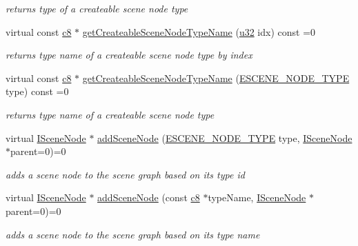 \begin{DoxyCompactItemize}
\begin{DoxyCompactList}\small\item\em returns type of a createable scene node type \end{DoxyCompactList}\item 
virtual const \hyperlink{namespaceirr_a9395eaea339bcb546b319e9c96bf7410}{c8} $\ast$ \hyperlink{classirr_1_1scene_1_1ISceneNodeFactory_a259f156cc367a9a89f79159ad2b665ac}{get\+Createable\+Scene\+Node\+Type\+Name} (\hyperlink{namespaceirr_a0416a53257075833e7002efd0a18e804}{u32} idx) const =0
\begin{DoxyCompactList}\small\item\em returns type name of a createable scene node type by index \end{DoxyCompactList}\item 
virtual const \hyperlink{namespaceirr_a9395eaea339bcb546b319e9c96bf7410}{c8} $\ast$ \hyperlink{classirr_1_1scene_1_1ISceneNodeFactory_addc09a5ab7a8d8b65182fbaa09c88b6f}{get\+Createable\+Scene\+Node\+Type\+Name} (\hyperlink{namespaceirr_1_1scene_acad3d7ef92a9807d391ba29120f3b7bd}{E\+S\+C\+E\+N\+E\+\_\+\+N\+O\+D\+E\+\_\+\+T\+Y\+PE} type) const =0
\begin{DoxyCompactList}\small\item\em returns type name of a createable scene node type \end{DoxyCompactList}\item 
virtual \hyperlink{classirr_1_1scene_1_1ISceneNode}{I\+Scene\+Node} $\ast$ \hyperlink{classirr_1_1scene_1_1ISceneNodeFactory_a540de57f9f72a70ee622c536859f5997}{add\+Scene\+Node} (\hyperlink{namespaceirr_1_1scene_acad3d7ef92a9807d391ba29120f3b7bd}{E\+S\+C\+E\+N\+E\+\_\+\+N\+O\+D\+E\+\_\+\+T\+Y\+PE} type, \hyperlink{classirr_1_1scene_1_1ISceneNode}{I\+Scene\+Node} $\ast$parent=0)=0
\begin{DoxyCompactList}\small\item\em adds a scene node to the scene graph based on its type id \end{DoxyCompactList}\item 
virtual \hyperlink{classirr_1_1scene_1_1ISceneNode}{I\+Scene\+Node} $\ast$ \hyperlink{classirr_1_1scene_1_1ISceneNodeFactory_a7964a7a29260d7f0d4d052b85df78ffb}{add\+Scene\+Node} (const \hyperlink{namespaceirr_a9395eaea339bcb546b319e9c96bf7410}{c8} $\ast$type\+Name, \hyperlink{classirr_1_1scene_1_1ISceneNode}{I\+Scene\+Node} $\ast$parent=0)=0
\begin{DoxyCompactList}\small\item\em adds a scene node to the scene graph based on its type name \end{DoxyCompactList}\item 

\end{DoxyCompactItemize}
